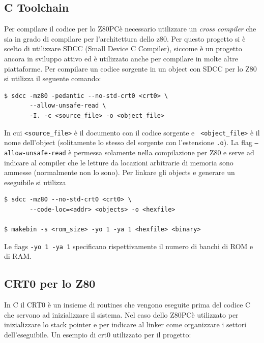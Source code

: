 \documentclass[a4paper, 11pt]{article}
\newcommand{\prj}{Z80\textmu PC\xspace}
\begin{document}
\subsection{C Toolchain}
Per compilare il codice per lo \prj \`e necessario utilizzare un \emph{cross
compiler} che sia in grado di compilare per l'architettura dello z80. Per
questo progetto si \`e scelto di utilizzare SDCC (Small Device C Compiler),
siccome \`e un progetto ancora in sviluppo attivo ed \`e utilizzato anche per
compilare in molte altre piattaforme. Per compilare un codice sorgente in un
object con SDCC per lo Z80 si utilizza il seguente comando:
\begin{verbatim}
$ sdcc -mz80 -pedantic --no-std-crt0 <crt0> \
       --allow-unsafe-read \
       -I. -c <source_file> -o <object_file>
\end{verbatim}
In cui {\tt <source\_file>} \`e il documento con il codice sorgente e {\tt
<object\_file>} \`e il nome dell'object (solitamente lo stesso del sorgente con
l'estensione {\tt .o}).  La flag {\tt --allow-unsafe-read} \`e permessa
solamente nella compilazione per Z80 e serve ad indicare al compiler che le
letture da locazioni arbitrarie di memoria sono ammesse (normalmente non lo
sono). Per linkare gli objects e generare un eseguibile si utilizza
\begin{verbatim}
$ sdcc -mz80 --no-std-crt0 <crt0> \
       --code-loc=<addr> <objects> -o <hexfile>

$ makebin -s <rom_size> -yo 1 -ya 1 <hexfile> <binary>
\end{verbatim}
Le flags {\tt -yo 1 -ya 1} specificano rispettivamente il numero di banchi di
ROM e di RAM.

\subsection{CRT0 per lo Z80}
In C il CRT0 \`e un insieme di routines che vengono eseguite prima del codice C
che servono ad inizializzare il sistema. Nel caso dello \prj \`e utilizzato per
inizializzare lo stack pointer e per indicare al linker come organizzare i
settori dell'eseguibile. Un esempio di crt0 utilizzato per il progetto:
\end{document}
